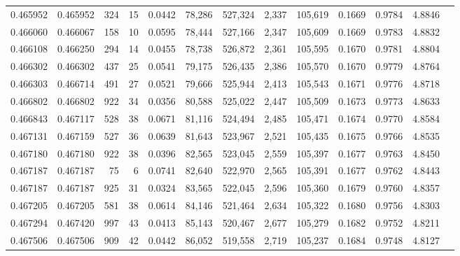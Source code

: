 \begin{tabular}{rrrrrrrrrrrrr}
0.465952 & 0.465952 &   324 &    15 &                                     0.0442 &  78,286 & 527,324 &   2,337 & 105,619 & 0.1669 & 0.9784 & 4.8846 \\
0.466060 & 0.466067 &   158 &    10 &                                     0.0595 &  78,444 & 527,166 &   2,347 & 105,609 & 0.1669 & 0.9783 & 4.8832 \\
0.466108 & 0.466250 &   294 &    14 &                                     0.0455 &  78,738 & 526,872 &   2,361 & 105,595 & 0.1670 & 0.9781 & 4.8804 \\
0.466302 & 0.466302 &   437 &    25 &                                     0.0541 &  79,175 & 526,435 &   2,386 & 105,570 & 0.1670 & 0.9779 & 4.8764 \\
0.466303 & 0.466714 &   491 &    27 &                                     0.0521 &  79,666 & 525,944 &   2,413 & 105,543 & 0.1671 & 0.9776 & 4.8718 \\
0.466802 & 0.466802 &   922 &    34 &                                     0.0356 &  80,588 & 525,022 &   2,447 & 105,509 & 0.1673 & 0.9773 & 4.8633 \\
0.466843 & 0.467117 &   528 &    38 &                                     0.0671 &  81,116 & 524,494 &   2,485 & 105,471 & 0.1674 & 0.9770 & 4.8584 \\
0.467131 & 0.467159 &   527 &    36 &                                     0.0639 &  81,643 & 523,967 &   2,521 & 105,435 & 0.1675 & 0.9766 & 4.8535 \\
0.467180 & 0.467180 &   922 &    38 &                                     0.0396 &  82,565 & 523,045 &   2,559 & 105,397 & 0.1677 & 0.9763 & 4.8450 \\
0.467187 & 0.467187 &    75 &     6 &                                     0.0741 &  82,640 & 522,970 &   2,565 & 105,391 & 0.1677 & 0.9762 & 4.8443 \\
0.467187 & 0.467187 &   925 &    31 &                                     0.0324 &  83,565 & 522,045 &   2,596 & 105,360 & 0.1679 & 0.9760 & 4.8357 \\
0.467205 & 0.467205 &   581 &    38 &                                     0.0614 &  84,146 & 521,464 &   2,634 & 105,322 & 0.1680 & 0.9756 & 4.8303 \\
0.467294 & 0.467420 &   997 &    43 &                                     0.0413 &  85,143 & 520,467 &   2,677 & 105,279 & 0.1682 & 0.9752 & 4.8211 \\
0.467506 & 0.467506 &   909 &    42 &                                     0.0442 &  86,052 & 519,558 &   2,719 & 105,237 & 0.1684 & 0.9748 & 4.8127 \\

\end{tabular}
